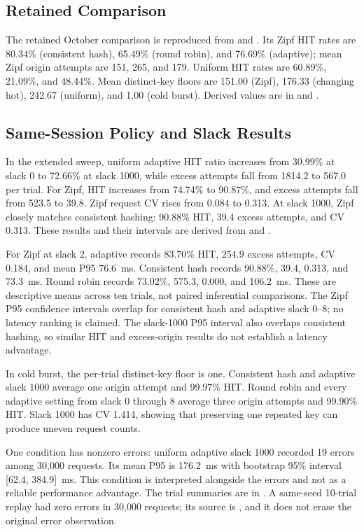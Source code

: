 \documentclass[conference]{IEEEtran}
\begin{document}
\subsection{Retained Comparison}
The retained October comparison is reproduced from
 and . Its
Zipf HIT rates are 80.34\% (consistent hash), 65.49\% (round robin), and
76.69\% (adaptive); mean Zipf origin attempts are 151, 265, and 179.
Uniform HIT rates are 60.89\%, 21.09\%, and 48.44\%. Mean distinct-key
floors are 151.00 (Zipf), 176.33 (changing hot), 242.67 (uniform), and
1.00 (cold burst). Derived values are in
 and
.

\subsection{Same-Session Policy and Slack Results}
In the extended sweep, uniform adaptive HIT ratio increases from 30.99\% at
slack 0 to 72.66\% at slack 1000, while excess attempts fall from 1814.2 to
567.0 per trial. For Zipf, HIT increases from 74.74\% to 90.87\%, and excess
attempts fall from 523.5 to 39.8. Zipf request CV rises from 0.084 to 0.313.
At slack 1000, Zipf closely matches consistent hashing: 90.88\% HIT, 39.4
excess attempts, and CV 0.313.
These results and their intervals are derived from
 and
.

For Zipf at slack 2, adaptive records 83.70\% HIT, 254.9 excess attempts,
CV 0.184, and mean P95 76.6~ms. Consistent hash records 90.88\%, 39.4,
0.313, and 73.3~ms. Round robin records 73.02\%, 575.3, 0.000, and
106.2~ms. These are descriptive means across ten trials, not paired
inferential comparisons. The Zipf P95 confidence intervals overlap for
consistent hash and adaptive slack 0--8; no latency ranking is claimed.
The slack-1000 P95 interval also overlaps consistent hashing, so similar
HIT and excess-origin results do not establish a latency advantage.

In cold burst, the per-trial distinct-key floor is one. Consistent hash and
adaptive slack 1000 average one origin attempt and 99.97\% HIT. Round robin
and every adaptive setting from slack 0 through 8 average three origin
attempts and 99.90\% HIT. Slack
1000 has CV 1.414, showing that preserving one repeated key can produce
uneven request counts.

One condition has nonzero errors: uniform adaptive slack 1000 recorded 19
errors among 30,000 requests. Its mean P95 is 176.2~ms with bootstrap 95\%
interval [62.4, 384.9]~ms. This condition is interpreted alongside the
errors and not as a reliable performance advantage. The trial summaries are
in . A same-seed
10-trial replay had zero errors in 30,000 requests; its source is
, and it does not erase the
original error observation.
\end{document}
